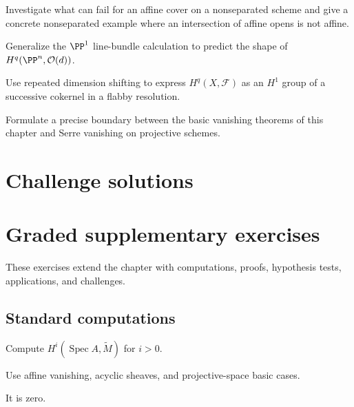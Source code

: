 \begin{problem}[Challenge]\label{chal:vi49-02}
Investigate what can fail for an affine cover on a nonseparated scheme and give a concrete nonseparated example where an intersection of affine opens is not affine.
\end{problem}

\begin{problem}[Challenge]\label{chal:vi49-03}
Generalize the $\PP^1$ line-bundle calculation to predict the shape of $H^q(\PP^n,\mathcal O(d))$.
\end{problem}

\begin{problem}[Challenge]\label{chal:vi49-04}
Use repeated dimension shifting to express $H^q(X,\mathcal F)$ as an $H^1$ group of a successive cokernel in a flabby resolution.
\end{problem}

\begin{problem}[Challenge]\label{chal:vi49-05}
Formulate a precise boundary between the basic vanishing theorems of this chapter and Serre vanishing on projective schemes.
\end{problem}

\ifdefined\IncludeChallengeSolutions
\section{Challenge solutions}

\fi
\section{Graded supplementary exercises}
These exercises extend the chapter with computations, proofs, hypothesis tests, applications, and challenges.

\subsection*{Standard computations}

\begin{exercise}\label{exr:vi49-expand-01}
Compute $H^i(\operatorname{Spec}A,\widetilde M)$ for $i>0$.
\end{exercise}
\begin{hint}
Use affine vanishing, acyclic sheaves, and projective-space basic cases.
\end{hint}
\begin{solution}
It is zero.
\end{solution}

